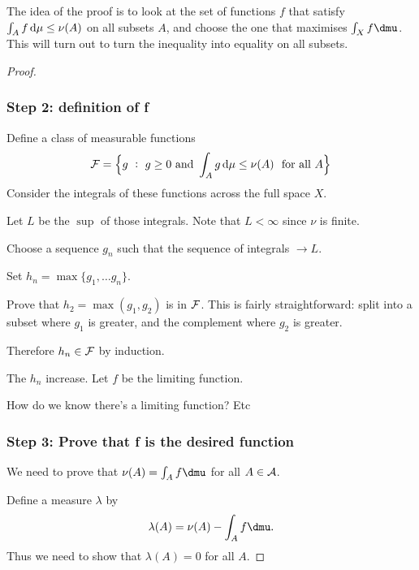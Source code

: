 The idea of the proof is to look at the set of functions $f$ that
satisfy $\int_A f \d\mu \leq \nu(A)$ on all subsets $A$, and choose the one that
maximises $\int_X f \dmu$. This will turn out to turn the inequality into equality on all subsets.


\begin{proof}~\\

  \subsubsection*{Step 2: definition of f}


  Define a class of measurable functions
  \begin{align*}
    \mc F = \Big\{g ~:~ g \geq 0 \text{~and~} \int_A g \d\mu \leq \nu(A) ~\text{~for all~} A\Big\}
  \end{align*}
  Consider the integrals of these functions across the full space $X$.

  Let $L$ be the $\sup$ of those integrals. Note that  $L < \infty$ since $\nu$ is finite.

  Choose a sequence $g_n$ such that the sequence of integrals $\to L$.

  Set $h_n = \max\{g_1, \ldots g_n\}$.

  Prove that $h_2 = \max(g_1, g_2)$ is in $\mathcal F$. This is fairly straightforward: split into a subset
  where $g_1$ is greater, and the complement where $g_2$ is greater.

  Therefore $h_n \in \mathcal F$ by induction.

  The $h_n$ increase. Let $f$ be the limiting function.

   How do we know there's a limiting function? Etc



  \subsubsection*{Step 3: Prove that f is the desired function}

  We need to prove that $\nu(A) = \int_A f \dmu$ for all $A \in \mathcal A$.

  Define a measure $\lambda$ by
  \begin{align*}
    \lambda(A) = \nu(A) - \int_A f \dmu.
  \end{align*}
  Thus we need to show that $\lambda(A) = 0$ for all $A$.


\end{proof}
